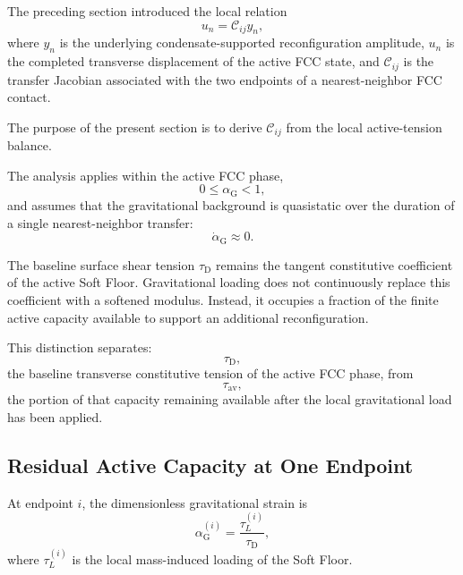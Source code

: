 The preceding section introduced the local relation
\begin{equation}
    u_n = \mathcal{C}_{ij}y_n,
\end{equation}
where $y_n$ is the underlying condensate-supported reconfiguration amplitude, $u_n$ is the completed transverse displacement of the active FCC state, and $\mathcal{C}_{ij}$ is the transfer Jacobian associated with the two endpoints of a nearest-neighbor FCC contact.

The purpose of the present section is to derive $\mathcal{C}_{ij}$ from the local active-tension balance.

The analysis applies within the active FCC phase,
\begin{equation}
    0 \leq \alpha_{\mathrm{G}} < 1,
\end{equation}
and assumes that the gravitational background is quasistatic over the duration of a single nearest-neighbor transfer:
\begin{equation}
    \dot{\alpha}_{\mathrm{G}} \approx 0.
\end{equation}

The baseline surface shear tension $\tau_{\mathrm{D}}$ remains the tangent constitutive coefficient of the active Soft Floor. Gravitational loading does not continuously replace this coefficient with a softened modulus. Instead, it occupies a fraction of the finite active capacity available to support an additional reconfiguration.

This distinction separates:
\begin{equation}
    \tau_{\mathrm{D}},
\end{equation}
the baseline transverse constitutive tension of the active FCC phase, from
\begin{equation}
    \tau_{\mathrm{av}},
\end{equation}
the portion of that capacity remaining available after the local gravitational load has been applied.

\subsection{Residual Active Capacity at One Endpoint}

At endpoint $i$, the dimensionless gravitational strain is
\begin{equation}
    \alpha_{\mathrm{G}}^{(i)} = \frac{\tau_L^{(i)}}{\tau_{\mathrm{D}}},
\end{equation}
where $\tau_L^{(i)}$ is the local mass-induced loading of the Soft Floor.

